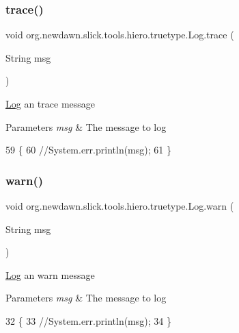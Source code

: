 \subsubsection{\texorpdfstring{trace()}{trace()}}
{\footnotesize\ttfamily void org.\+newdawn.\+slick.\+tools.\+hiero.\+truetype.\+Log.\+trace (\begin{DoxyParamCaption}\item[{String}]{msg }\end{DoxyParamCaption})\hspace{0.3cm}{\ttfamily [inline]}}

\mbox{\hyperlink{classorg_1_1newdawn_1_1slick_1_1tools_1_1hiero_1_1truetype_1_1_log}{Log}} an trace message


\begin{DoxyParams}{Parameters}
{\em msg} & The message to log \\
\hline
\end{DoxyParams}

\begin{DoxyCode}
59                                   \{
60         \textcolor{comment}{//System.err.println(msg);}
61     \}
\end{DoxyCode}
\mbox{\label{classorg_1_1newdawn_1_1slick_1_1tools_1_1hiero_1_1truetype_1_1_log_aa0cb9dec081b4bcfe0d361f8d0ada0f7}} 
\subsubsection{\texorpdfstring{warn()}{warn()}}
{\footnotesize\ttfamily void org.\+newdawn.\+slick.\+tools.\+hiero.\+truetype.\+Log.\+warn (\begin{DoxyParamCaption}\item[{String}]{msg }\end{DoxyParamCaption})\hspace{0.3cm}{\ttfamily [inline]}}

\mbox{\hyperlink{classorg_1_1newdawn_1_1slick_1_1tools_1_1hiero_1_1truetype_1_1_log}{Log}} an warn message


\begin{DoxyParams}{Parameters}
{\em msg} & The message to log \\
\hline
\end{DoxyParams}

\begin{DoxyCode}
32                                  \{
33         \textcolor{comment}{//System.err.println(msg);}
34     \}
\end{DoxyCode}
